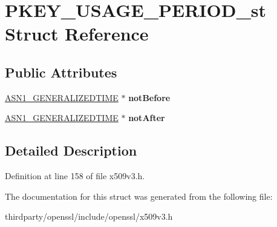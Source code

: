 \hypertarget{struct_p_k_e_y___u_s_a_g_e___p_e_r_i_o_d__st}{}\section{P\+K\+E\+Y\+\_\+\+U\+S\+A\+G\+E\+\_\+\+P\+E\+R\+I\+O\+D\+\_\+st Struct Reference}
\label{struct_p_k_e_y___u_s_a_g_e___p_e_r_i_o_d__st}
\subsection*{Public Attributes}
\begin{DoxyCompactItemize}
\item 
\mbox{\label{struct_p_k_e_y___u_s_a_g_e___p_e_r_i_o_d__st_a242441661347dbe5bb0006a542f39d2c}} 
\hyperlink{structasn1__string__st}{A\+S\+N1\+\_\+\+G\+E\+N\+E\+R\+A\+L\+I\+Z\+E\+D\+T\+I\+ME} $\ast$ {\bfseries not\+Before}
\item 
\mbox{\label{struct_p_k_e_y___u_s_a_g_e___p_e_r_i_o_d__st_afe94d8f367b6bfb458c1df5081908cac}} 
\hyperlink{structasn1__string__st}{A\+S\+N1\+\_\+\+G\+E\+N\+E\+R\+A\+L\+I\+Z\+E\+D\+T\+I\+ME} $\ast$ {\bfseries not\+After}
\end{DoxyCompactItemize}


\subsection{Detailed Description}


Definition at line 158 of file x509v3.\+h.



The documentation for this struct was generated from the following file\+:\begin{DoxyCompactItemize}
\item 
thirdparty/openssl/include/openssl/x509v3.\+h\end{DoxyCompactItemize}
